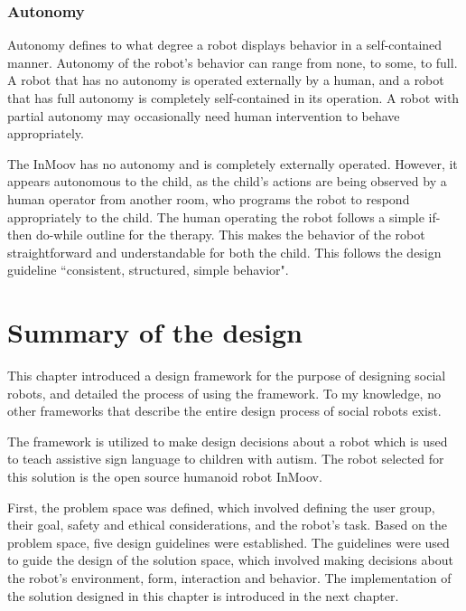 \subsubsection{Autonomy}

Autonomy defines to what degree a robot displays behavior in a self-contained manner. Autonomy of the robot's behavior can range from none, to some, to full. A robot that has no autonomy is operated externally by a human, and a robot that has full autonomy is completely self-contained in its operation. A robot with partial autonomy may occasionally need human intervention to behave appropriately.

The InMoov has no autonomy and is completely externally operated. However, it appears autonomous to the child, as the child's actions are being observed by a human operator from another room, who programs the robot to respond appropriately to the child. The human operating the robot follows a simple if-then do-while outline for the therapy. This makes the behavior of the robot straightforward and understandable for both the child. This follows the design guideline ``consistent, structured, simple behavior".



\section{Summary of the design}

This chapter introduced a design framework for the purpose of designing social robots, and detailed the process of using the framework. To my knowledge, no other frameworks that describe the entire design process of social robots exist.

The framework is utilized to make design decisions about a robot which is used to teach assistive sign language to children with autism. The robot selected for this solution is the open source humanoid robot InMoov. 

First, the problem space was defined, which involved defining the user group, their goal, safety and ethical considerations, and the robot's task. Based on the problem space, five design guidelines were established. The guidelines were used to guide the design of the solution space, which involved making decisions about the robot's environment, form, interaction and behavior. The implementation of the solution designed in this chapter is introduced in the next chapter.
